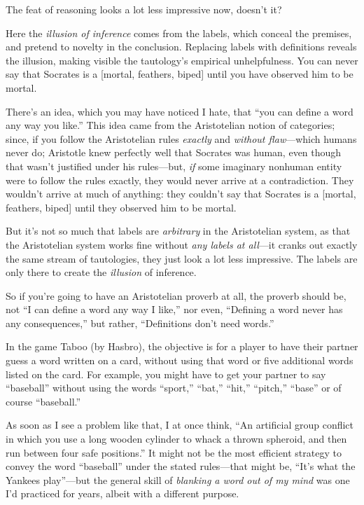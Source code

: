 {
 The feat of reasoning looks a lot less impressive now,
doesn't it?}

{
 Here the \textit{illusion of inference} comes from the labels,
which conceal the premises, and pretend to novelty in the conclusion.
Replacing labels with definitions reveals the illusion, making visible
the tautology's empirical unhelpfulness. You can never
say that Socrates is a [mortal, {\textlnot}feathers, biped] until you
have observed him to be mortal.}

{
 There's an idea, which you may have noticed I
hate, that ``you can define a word any way you
like.'' This idea came from the Aristotelian notion
of categories; since, if you follow the Aristotelian rules
\textit{exactly} and \textit{without flaw}{}---which humans never do;
Aristotle knew perfectly well that Socrates was human, even though that
wasn't justified under his rules---but, \textit{if}
some imaginary nonhuman entity were to follow the rules exactly, they
would never arrive at a contradiction. They wouldn't
arrive at much of anything: they couldn't say that
Socrates is a [mortal, {\textlnot}feathers, biped] until they observed
him to be mortal.}

{
 But it's not so much that labels are
\textit{arbitrary} in the Aristotelian system, as that the Aristotelian
system works fine without \textit{any labels at all}{}---it cranks out
exactly the same stream of tautologies, they just look a lot less
impressive. The labels are only there to create the \textit{illusion}
of inference.}

{
 So if you're going to have an Aristotelian proverb
at all, the proverb should be, not ``I can define a
word any way I like,'' nor even,
``Defining a word never has any
consequences,'' but rather,
``Definitions don't need
words.''}

\myendsectiontext


{
 In the game Taboo (by Hasbro), the objective is for a player to
have their partner guess a word written on a card, without using that
word or five additional words listed on the card. For example, you
might have to get your partner to say
``baseball'' without using the words
``sport,''
``bat,''
``hit,''
``pitch,''
``base'' or of course
``baseball.'' }

{
 As soon as I see a problem like that, I at once think,
``An artificial group conflict in which you use a long
wooden cylinder to whack a thrown spheroid, and then run between four
safe positions.'' It might not be the most efficient
strategy to convey the word
``baseball'' under the stated
rules---that might be, ``It's what the
Yankees play''---but the general skill of
\textit{blanking a word out of my mind} was one I'd
practiced for years, albeit with a different purpose.}

